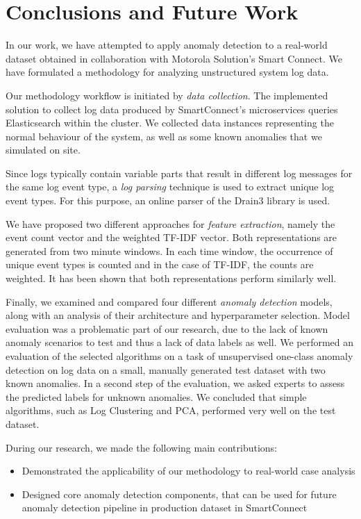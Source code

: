\chapter{Conclusions and Future Work}
\label{conclusion}
In our work, we have attempted to apply anomaly detection to a real-world dataset obtained in collaboration with Motorola Solution's Smart Connect. We have formulated a methodology for analyzing unstructured system log data. 

Our methodology workflow is initiated by \textit{data collection}. The implemented solution to collect log data produced by SmartConnect's microservices queries Elasticsearch within the cluster. We collected data instances representing the normal behaviour of the system, as well as some known anomalies that we simulated on site.

Since logs typically contain variable parts that result in different log messages for the same log event type, a \textit{log parsing} technique is used to extract unique log event types. For this purpose, an online parser of the Drain3 library is used. 

We have proposed two different approaches for \textit{feature extraction}, namely the event count vector and the weighted TF-IDF vector. Both representations are generated from two minute windows. In each time window, the occurrence of unique event types is counted and in the case of TF-IDF, the counts are weighted. It has been shown that both representations perform similarly well.

Finally, we examined and compared four different \textit{anomaly detection} models, along with an analysis of their architecture and hyperparameter selection. Model evaluation was a problematic part of our research, due to the lack of known anomaly scenarios to test and thus a lack of data labels as well. We performed an evaluation of the selected algorithms on a task of unsupervised one-class anomaly detection on log data on a small, manually generated test dataset with two known anomalies. In a second step of the evaluation, we asked experts to assess the predicted labels for unknown anomalies. We concluded that simple algorithms, such as Log Clustering and PCA, performed very well on the test dataset.

During our research, we made the following main contributions:

\begin{itemize}
    \item Demonstrated the applicability of our methodology to real-world case analysis
    \item Designed core anomaly detection components, that can be used for future anomaly detection pipeline in production dataset in SmartConnect
\end{itemize}

